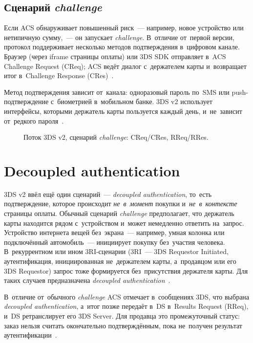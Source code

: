 \subsection*{Сценарий \textit{challenge}}

Если ACS обнаруживает повышенный риск~--- например, новое устройство или нетипичную
сумму,~--- он запускает \textit{challenge}. В~отличие
от~первой версии, протокол поддерживает несколько методов подтверждения
в~цифровом канале. Браузер (через iframe страницы оплаты) или 3DS SDK
отправляет в~ACS Challenge Request (CReq); ACS ведёт диалог с~держателем карты
и~возвращает итог в~Challenge Response (CRes)~\cite{emvco-3ds-whitepaper}.

Метод подтверждения зависит от~канала: одноразовый пароль по~SMS или
push-подтверждение с~биометрией в~мобильном банке. 3DS v2 использует
интерфейсы, которыми держатель карты пользуется каждый день, и~не~зависит
от~редкого пароля~\cite{emvco-3ds-whitepaper}.

\begin{figure}[htbp]
  \centering
  \caption{Поток 3DS v2, сценарий \textit{challenge}: CReq/CRes, RReq/RRes.}%
  \label{fig:3ds-v2-flow-challenge}
\end{figure}

\FloatBarrier
\section{Decoupled authentication}\label{sec:3ds-decoupled}

3DS v2 ввёл ещё один сценарий~--- \textit{decoupled
authentication}, то~есть подтверждение, которое происходит \emph{не~в~момент}
покупки и~\emph{не~в~контексте} страницы оплаты. Обычный сценарий
\textit{challenge} предполагает, что держатель карты находится рядом
с~устройством и~может немедленно ответить на~запрос. Устройство интернета
вещей без~экрана~--- например, умная колонка или подключённый автомобиль~---
инициирует покупку без~участия человека. В~рекуррентном или ином 3RI-сценарии
(3RI~--- 3DS Requestor Initiated, аутентификация, инициированная не~держателем
карты, а~продавцом или его 3DS Requestor) запрос тоже формируется без~присутствия
держателя карты. Для таких случаев предназначена \textit{decoupled
authentication}~\cite{emvco-3ds-decoupled}.

В~отличие от~обычного \textit{challenge} ACS отмечает в~сообщениях
3DS, что выбрана \textit{decoupled authentication}, а~итог позже передаёт в~DS
в~Results Request (RReq), и~DS ретранслирует его 3DS Server. Для продавца это промежуточный статус: заказ нельзя считать
окончательно подтверждённым, пока не~получен результат
аутентификации~\cite{emvco-3ds-decoupled}.

